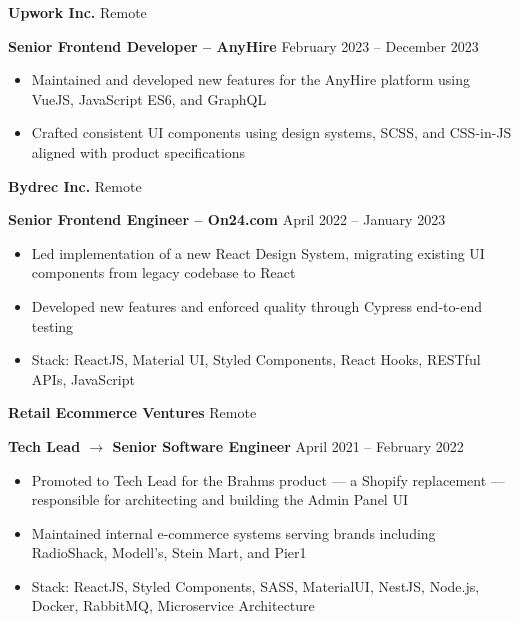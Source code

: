 \documentclass[11pt]{article}
\begin{document}
\vspace{12pt}

\textbf{Upwork Inc.} \hfill Remote

\textbf{Senior Frontend Developer -- AnyHire} \hfill February 2023 -- December 2023
\begin{itemize}[noitemsep, topsep=0pt, partopsep=0pt, parsep=0pt]
    \item Maintained and developed new features for the AnyHire platform using VueJS, JavaScript ES6, and GraphQL
    \item Crafted consistent UI components using design systems, SCSS, and CSS-in-JS aligned with product specifications
\end{itemize}

\vspace{12pt}

\textbf{Bydrec Inc.} \hfill Remote

\textbf{Senior Frontend Engineer -- On24.com} \hfill April 2022 -- January 2023
\begin{itemize}[noitemsep, topsep=0pt, partopsep=0pt, parsep=0pt]
    \item Led implementation of a new React Design System, migrating existing UI components from legacy codebase to React
    \item Developed new features and enforced quality through Cypress end-to-end testing
    \item Stack: ReactJS, Material UI, Styled Components, React Hooks, RESTful APIs, JavaScript
\end{itemize}

\vspace{12pt}

\textbf{Retail Ecommerce Ventures} \hfill Remote

\textbf{Tech Lead $\rightarrow$ Senior Software Engineer} \hfill April 2021 -- February 2022
\begin{itemize}[noitemsep, topsep=0pt, partopsep=0pt, parsep=0pt]
    \item Promoted to Tech Lead for the Brahms product --- a Shopify replacement --- responsible for architecting and building the Admin Panel UI
    \item Maintained internal e-commerce systems serving brands including RadioShack, Modell's, Stein Mart, and Pier1
    \item Stack: ReactJS, Styled Components, SASS, MaterialUI, NestJS, Node.js, Docker, RabbitMQ, Microservice Architecture
\end{itemize}
\end{document}
